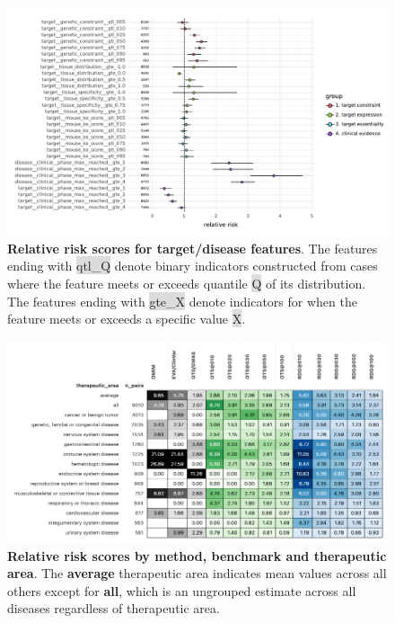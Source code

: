 \documentclass{article}
\begin{document}
\begin{figure}[H]
  \centering
  \captionsetup{width=.9\linewidth}
  \includegraphics[width=1\textwidth]{relative_risk_static_features.pdf}
  \caption{
    \textbf{Relative risk scores for target/disease features}.
    The features ending with \colorbox{Gainsboro}{qtl\_Q} denote binary indicators constructed from cases where the feature meets or exceeds quantile \colorbox{Gainsboro}{Q} of its distribution. The features ending with \colorbox{Gainsboro}{gte\_X} denote indicators for when the feature meets or exceeds a specific value \colorbox{Gainsboro}{X}.
  }
  \label{fig:relative_risk_static_features}
\end{figure}

\pagebreak

\begin{figure}[H]
  \centering
  \captionsetup{width=.9\linewidth}
  \includegraphics[width=1\textwidth]{relative_risk_by_ta.png}
  \caption{
    \textbf{Relative risk scores by method, benchmark and therapeutic area}.
    The \textbf{average} therapeutic area indicates mean values across all others except for \textbf{all}, which is an ungrouped estimate across all diseases regardless of therapeutic area.
  }
  \label{fig:relative_risk_by_ta}
\end{figure}
  
\end{document}
